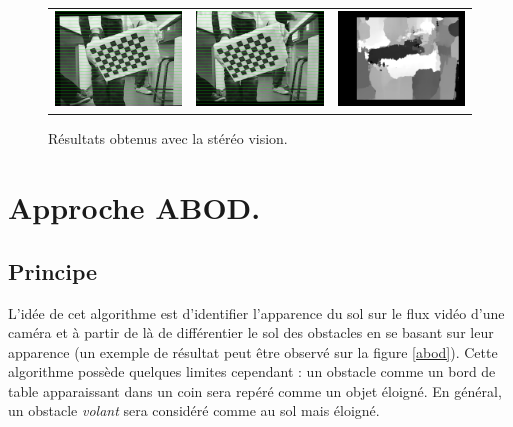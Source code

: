 \begin{figure}
\begin{center}
\begin{tabular}{ccc}
            \includegraphics[width=0.3\linewidth]{rcs/rem2l.png} & \includegraphics[width=0.3\linewidth]{rcs/rem2r.png} & \includegraphics[width=0.3\linewidth]{rcs/disp2.png} \\
        \end{tabular}
    \end{center}
    \caption{Résultats obtenus avec la stéréo vision.}
    \label{disp_result}
\end{figure}

\section{Approche ABOD.}
\subsection{Principe} L'idée de cet algorithme est d'identifier l'apparence du sol sur le flux vidéo d'une caméra et à partir de là de différentier le sol des obstacles en se basant sur leur apparence (un exemple de résultat peut être observé sur la figure \ref{abod}). Cette algorithme possède quelques limites cependant : un obstacle comme un bord de table apparaissant dans un coin sera repéré comme un objet éloigné. En général, un obstacle \emph{volant} sera considéré comme au sol mais éloigné.

